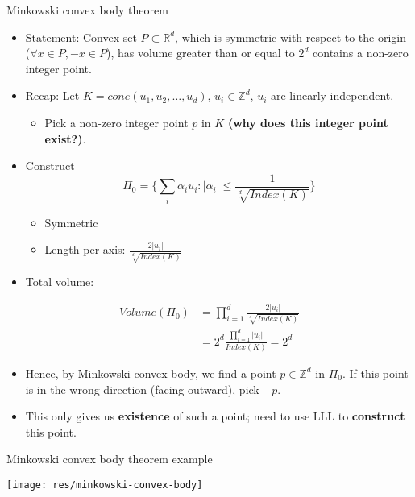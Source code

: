 \documentclass[8pt]{beamer}
\begin{document}
\begin{frame}[label=sec-19]{Minkowski convex body theorem}
\begin{itemize}
\item Statement: Convex set $P \subset \mathbb{R}^d$, which is symmetric with respect to the origin ($\forall x \in P, -x \in P$), has volume greater than or
equal to $2^d$ contains a non-zero integer point.

\item Recap: Let $K = cone(u_1, u_2, \ldots, u_d)$, $u_i \in \mathbb{Z}^d$, $u_i$ are linearly independent.
\begin{itemize}
\item Pick a non-zero integer point $p$ in $K$ \textbf{(why does this integer point exist?)}.
\end{itemize}

\item Construct $$\Pi_0 = \Bigg\{ \sum_i \alpha_i u_i :  |\alpha_i| \leq \frac{1}{\sqrt[d]{Index(K)}}  \Bigg\}$$
\begin{itemize}
\item Symmetric
\item Length per axis: $\frac{2 |u_i|}{\sqrt[d]{Index(K)}}$
\end{itemize}

\item Total volume:
\end{itemize}
\begin{align*}
Volume(\Pi_0) &= \prod_{i=1}^d \frac{2 |u_i|}{\sqrt[d]{Index(K)}}\\
 &= 2^d \frac{ \prod_{i=1}^d |u_i| }{Index(K)} = 2^d
\end{align*}

\begin{itemize}
\item Hence, by Minkowski convex body, we find a point $p \in \mathbb{Z}^d$ in $\Pi_0$. If this point is in the wrong direction (facing outward), pick $-p$.

\item This only gives us \textbf{existence} of such a point; need to use LLL to \textbf{construct} this point.
\end{itemize}
\end{frame}

\begin{frame}[label=sec-20]{Minkowski convex body theorem example}
\begin{center}
\texttt{[image: res/minkowski-convex-body]}
\end{center}
\end{frame}
\end{document}
